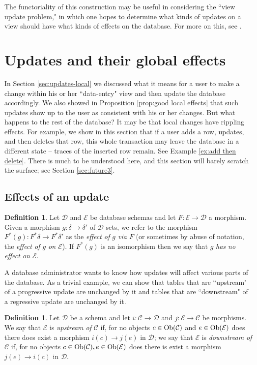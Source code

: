 \documentclass{amsart}
\def\tn{\textnormal}
\def\mc{\mathcal}
\def\Ob{\tn{Ob}}
\def\to{\rightarrow}
\def\taking{\colon}
\def\mcC{\mc{C}}
\def\mcD{\mc{D}}
\def\mcE{\mc{E}}
\theoremstyle{remark}
\theoremstyle{definition}
\newtheorem{definition}[theorem]{Definition}
\begin{document}
The functoriality of this construction may be useful in considering the ``view update problem," in which one hopes to determine what kinds of updates on a view should have what kinds of effects on the database.  For more on this, see \cite{P2}.

\section{Updates and their global effects}\label{sec:updates-global}

In Section \ref{sec:updates-local} we discussed what it means for a user to make a change within his or her ``data-entry" view and then update the database accordingly.  We also showed in Proposition \ref{prop:good local effects} that such updates show up to the user as consistent with his or her changes.  But what happens to the rest of the database?  It may be that local changes have rippling effects.  For example, we show in this section that if a user adds a row, updates, and then deletes that row, this whole transaction may leave the database in a different state -- traces of the inserted row remain.  See Example \ref{ex:add then delete}.  There is much to be understood here, and this section will barely scratch the surface; see Section \ref{sec:future3}.

\subsection{Effects of an update}\label{subsec:other effects}

\begin{definition}

Let $\mcD$ and $\mcE$ be database schemas and let $F\taking\mcE\to\mcD$ a morphism.  Given a morphism $g\taking\delta\to\delta'$ of $\mcD$-sets, we refer to the morphism $F^*(g)\taking F^*\delta\to F^*\delta'$ as the {\em effect of $g$ via $F$} (or sometimes by abuse of notation, the {\em effect of $g$ on $\mcE$}).  If $F^*(g)$ is an isomorphism then we say that $g$ {\em has no effect on $\mcE$}.

\end{definition}

A database administrator wants to know how updates will affect various parts of the database.  As a trivial example, we can show that tables that are ``upstream" of a progressive update are unchanged by it and tables that are ``downstream" of a regressive update are unchanged by it.

\begin{definition}

Let $\mcD$ be a schema and let $i\taking\mcC\to\mcD$ and $j\taking\mcE\to\mcC$ be morphisms.  We say that $\mcE$ is {\em upstream of} $\mcC$ if, for no objects $c\in\Ob(\mcC)$ and $e\in\Ob(\mcE)$ does there does exist a morphism $i(c)\to j(e)$ in $\mcD$; we say that $\mcE$ is {\em downstream of} $\mcC$ if, for no objects $c\in\Ob(\mcC), e\in\Ob(\mcE)$ does there is exist a morphism $j(e)\to i(c)$ in $\mcD$.  

\end{definition}
\end{document}
